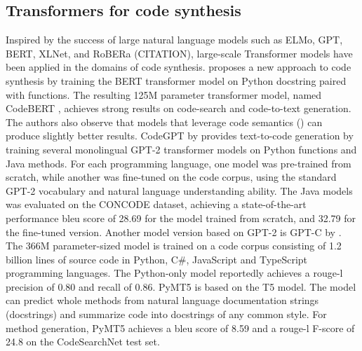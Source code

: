 \subsection{Transformers for code synthesis}
\label{sec:transformers-for-code-synthesis}
Inspired by the success of large natural language models such as ELMo, GPT, BERT, XLNet, and RoBERa (CITATION), large-scale Transformer models have been applied in the domains of code synthesis. \textcite{feng2020codebert} proposes a new approach to code synthesis by training the BERT transformer model on Python \gls{docstring} paired with functions. The resulting 125M parameter transformer model, named CodeBERT \cite{feng2020codebert}, achieves strong results on code-search and code-to-text generation. The authors also observe that models that leverage code semantics () can produce slightly better results. CodeGPT by \cite{lu2021codexglue} provides text-to-code generation by training several monolingual GPT-2 transformer models on Python functions and Java methods. For each programming language, one model was pre-trained from scratch, while another was fine-tuned on the code corpus, using the standard GPT-2 vocabulary and natural language understanding ability. The Java models was evaluated on the CONCODE  dataset, achieving a state-of-the-art performance \acrshort{bleu} score \cite{papineni2002bleu} of 28.69 for the model trained from scratch, and 32.79 for the fine-tuned version. Another model version based on GPT-2 is GPT-C by \textcite{svyatkovskiy2020intellicode}. The 366M parameter-sized model is trained on a code corpus consisting of 1.2 billion lines of source code in Python, C\#, JavaScript and TypeScript programming languages. The Python-only model reportedly achieves a \gls{rouge-l} precision of 0.80 and recall of 0.86. PyMT5 \textcite{colin2020pymt5} is based on the T5 model. The model can predict whole methods from natural language documentation strings (docstrings) and summarize code into docstrings of any common style. For method generation, PyMT5 achieves a \gls{bleu} score of 8.59 and a \gls{rouge-l} F-score of 24.8 on the CodeSearchNet  test set.

